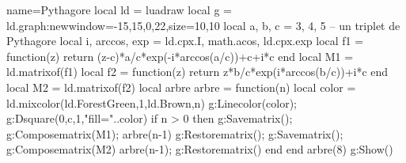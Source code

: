 \begin{luadraw}{name=Pythagore}
local ld = luadraw
local g = ld.graph:new{window={-15,15,0,22},size={10,10}}
local a, b, c = 3, 4, 5 -- un triplet de Pythagore
local i, arccos, exp = ld.cpx.I, math.acos, ld.cpx.exp
local f1 = function(z)
    return (z-c)*a/c*exp(-i*arccos(a/c))+c+i*c end
local M1 = ld.matrixof(f1)
local f2 = function(z)
    return z*b/c*exp(i*arccos(b/c))+i*c end
local M2 = ld.matrixof(f2)
local arbre
arbre = function(n)
    local color = ld.mixcolor(ld.ForestGreen,1,ld.Brown,n)
    g:Linecolor(color); g:Dsquare(0,c,1,"fill="..color)
    if n > 0 then
        g:Savematrix(); g:Composematrix(M1); arbre(n-1)
        g:Restorematrix(); g:Savematrix(); g:Composematrix(M2)
        arbre(n-1); g:Restorematrix()
    end
end
arbre(8)
g:Show()
\end{luadraw}
